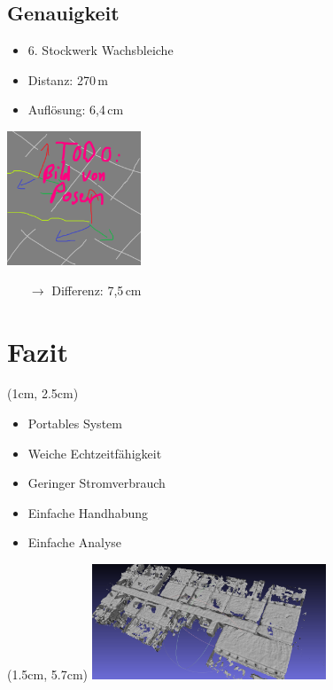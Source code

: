 \documentclass{beamer}
\begin{document}
\subsection{Genauigkeit}
\begin{frame}{\subsecname}
\begin{itemize}
\item{6. Stockwerk Wachsbleiche}
\item{Distanz: 270\,m}
\item{Auflösung: 6,4\,cm}
\end{itemize}
\begin{center}
\includegraphics[width=4cm]{images/pose_difference.png}
\end{center}
\begin{itemize}
\item[$\rightarrow$]{Differenz: 7,5\,cm}
\end{itemize}
\end{frame}

\section*{Fazit}
\begin{frame}{\secname}
\begin{center}
\begin{textblock*}{15cm}(1cm, 2.5cm)
\begin{itemize}
\item{Portables System}
\item{Weiche Echtzeitfähigkeit}
\item{Geringer Stromverbrauch}
\item{Einfache Handhabung}
\item{Einfache Analyse}
\end{itemize}   
\end{textblock*}
\begin{textblock*}{7cm} (1.5cm, 5.7cm)
\includegraphics[width=7cm]{images/mesh_wb.png}
\end{textblock*}
\end{center}
\end{frame}
\end{document}
